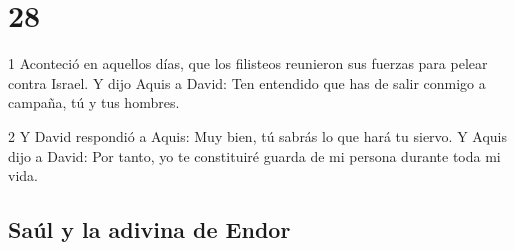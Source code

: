 {\chapter{28}


\par 1 Aconteció en aquellos días, que los filisteos reunieron sus fuerzas para pelear contra Israel. Y dijo Aquis a David: Ten entendido que has de salir conmigo a campaña, tú y tus hombres.
\par 2 Y David respondió a Aquis: Muy bien, tú sabrás lo que hará tu siervo. Y Aquis dijo a David: Por tanto, yo te constituiré guarda de mi persona durante toda mi vida.

\section*{Saúl y la adivina de Endor}

}
